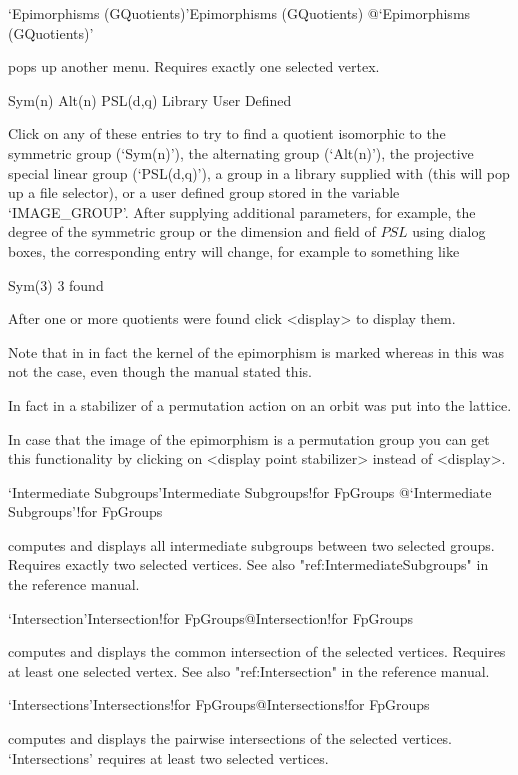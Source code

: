 \>`Epimorphisms (GQuotients)'{Epimorphisms (GQuotients)}%
@{`Epimorphisms (GQuotients)'}

pops up another menu. Requires exactly one selected vertex.

\begintt
Sym(n)
Alt(n)
PSL(d,q)
Library
User Defined 
\endtt

Click on any of these entries to try to find a quotient isomorphic to the
symmetric group (`Sym(n)'), the alternating group (`Alt(n)'), the projective
special linear group (`PSL(d,q)'), a group in a library supplied with
{\XGAP} (this will pop up a file selector), or a user defined group stored
in the variable `IMAGE_GROUP'.  After supplying additional parameters, for
example, the degree of the symmetric group or the dimension and field of
$PSL$ using dialog boxes, the corresponding entry will change, for example
to something like

\begintt
Sym(3)        3 found
\endtt

After one or more quotients were found click <display> to display them.

Note that in {} in fact the kernel of the epimorphism is marked whereas 
in {} this was not the case, even though the {} manual stated
this.  

In fact in {} a stabilizer of a permutation action on an orbit was
put into the lattice.

In case that the image of the epimorphism is a permutation group you can
get this functionality by clicking on <display point stabilizer> instead of 
<display>. 

\>`Intermediate Subgroups'{Intermediate Subgroups!for FpGroups}%
@{`Intermediate Subgroups'!for FpGroups}

computes and displays all intermediate subgroups between two selected
groups. Requires exactly two selected vertices. See also
"ref:IntermediateSubgroups" in the {\GAP} reference manual. 

\>`Intersection'{Intersection!for FpGroups}@{Intersection!for FpGroups}

computes and displays the common intersection of the selected vertices.
Requires at least one selected vertex.  See also "ref:Intersection" in the
{\GAP} reference manual.

\>`Intersections'{Intersections!for FpGroups}@{Intersections!for FpGroups}

computes and   displays   the pairwise   intersections  of  the  selected
vertices.  `Intersections' requires at least two selected vertices.

